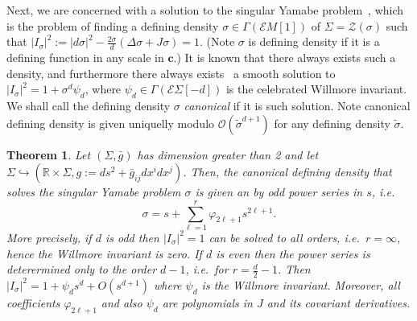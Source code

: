 \documentclass[a4paper,10.9pt]{amsart}
\newtheorem{theorem}{Theorem}[section]
\theoremstyle{definition}
\theoremstyle{remark}
\newcommand{\IIIo}{{\mathring{{\bf\rm I\hspace{-.2mm} I \hspace{-.2mm} I}}{\hspace{.2mm}}}{}}
\def\sideremark#1{\ifvmode\leavevmode\fi\vadjust{\vbox to0pt{\vss
 \hbox to 0pt{\hskip\hsize\hskip1em
 \vbox{\hsize2cm\tiny\raggedright\pretolerance10000
  \noindent #1\hfill}\hss}\vbox to8pt{\vfil}\vss}}}
\newcommand{\edz}[1]{\sideremark{#1}}
\def\idx#1{{\em #1\/}} %
\numberwithin{equation}{section}
\newcommand{\cc}{\boldsymbol{c}}
\renewcommand{\=}{\stackrel \Sigma =}
\newcommand{\ce}{\mathcal{E}}
\begin{document}
%

Next, we are concerned with a solution to the singular Yamabe problem~\cite{Loewner,Aviles,ACF}, which is the problem of 
finding a defining density $\sigma \in \Gamma(\ce M[1])$ of $\Sigma = \mathcal{Z}(\sigma)$ such that 
$|I_{\sigma}|^2 := |d\sigma|^2 - \tfrac{2\sigma}{d}(\Delta \sigma + J \sigma) = 1$. 
(Note $\sigma$ is defining density if it is a defining function in any scale in $\cc$.)
It is known that there always exists such a density, and furthermore there always exists~\cite{Will1} a smooth solution to $|I_{\sigma}|^2 = 1 + \sigma^d \psi_d$, 
where $\psi_d \in \Gamma(\ce \Sigma[-d])$ is the celebrated Willmore invariant. 
We shall call the defining density $\sigma$ \idx{canonical} if it is such solution. Note
canonical defining density is given uniquelly modulo $\mathcal{O}(\tilde{\sigma}^{d+1})$ for any defining density 
$\tilde{\sigma}$.


\begin{theorem} \label{Yamabe-general}
Let $(\Sigma,\bar{g})$ has dimension greater than 2 and let 
$\Sigma \hookrightarrow (\mathbb{R} \times \Sigma,g:= ds^2 + \bar{g}_{ij} dx^i dx^j)$. Then, 
the canonical defining density that solves the singular Yamabe problem $\sigma$ is given an by
odd power series in $s$, i.e.
$$
\sigma = s + \sum_{\ell=1}^r \varphi_{2\ell+1} s^{2\ell+1}.
$$
More precisely, if $d$ is odd then $|I_\sigma|^2=1$ can be solved to all orders,
i.e.\ $r=\infty$, hence the Willmore invariant is zero.
If $d$ is even then the power series is deterermined only to the order $d-1$, i.e.\ for $r=\tfrac{d}{2}-1$.
Then $|I_\sigma|^2=1 + \psi_{d}s^d + O(s^{d+1})$ where $\psi_d$ is the Willmore invariant.
Moreover, all coefficients $\varphi_{2\ell+1}$  and also $\psi_{d}$
are polynomials in $J$ and its covariant derivatives.
\end{theorem}
\end{document}
